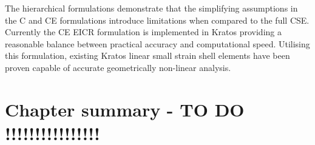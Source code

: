 The hierarchical formulations demonstrate that the simplifying assumptions in the C and CE formulations introduce limitations when compared to the full CSE. Currently the CE EICR formulation is implemented in Kratos providing a reasonable balance between practical accuracy and computational speed. Utilising this formulation, existing Kratos linear small strain shell elements have been proven capable of accurate geometrically non-linear analysis.

\section{Chapter summary - TO DO !!!!!!!!!!!!!!!!}
